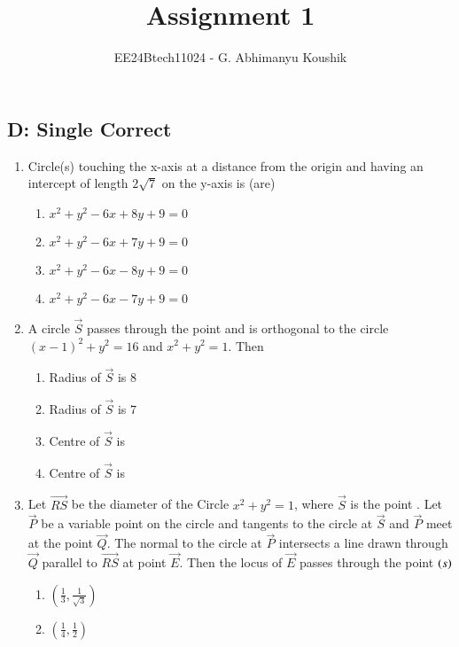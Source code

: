 \documentclass[journal,12pt,twocolumn]{IEEEtran}
\theoremstyle{remark}
\begin{document}
\title{Assignment 1}
\author{EE24Btech11024 - G. Abhimanyu Koushik}
\maketitle
\newpage
\bigskip
\renewcommand{\thefigure}{\theenumi}
\renewcommand{\thetable}{\theenumi}
\subsection*{D: Single Correct}
\begin{enumerate}
\item Circle(s) touching the x-axis at a distance  from the origin and having an intercept of length $2\sqrt{7}$ on the y-axis is (are)
\hfill {}
\begin{enumerate}[label=(\alph*)]
\item $x^2 + y^2 - 6x + 8y + 9 = 0$
\item $x^2 + y^2 - 6x + 7y + 9 = 0$
\item $x^2 + y^2 - 6x - 8y + 9 = 0$
\item $x^2 + y^2 - 6x - 7y + 9 = 0$
\end{enumerate}
\item A circle $\vec{S}$ passes through the point  and is orthogonal to the circle $(x-1)^2+y^2=16$ and $x^2+y^2=1$. Then
\hfill{}
\begin{enumerate}[label=(\alph*)]
\item Radius of $\vec{S}$ is $8$
\item Radius of $\vec{S}$ is $7$
\item Centre of $\vec{S}$ is 
\item Centre of $\vec{S}$ is 
\end{enumerate}
\item Let $\vec{RS}$ be the diameter of the Circle $x^{2} + y^{2} = 1$, where $\vec{S}$ is the point . Let $\vec{P}$ be a variable point  on the circle and tangents to the circle at $\vec{S}$ and $\vec{P}$ meet at the point $\vec{Q}$. The normal to the circle at $\vec{P}$ intersects a line drawn through $\vec{Q}$ parallel to $\vec{RS}$ at point $\vec{E}$. Then the locus of $\vec{E}$ passes through the point $\left(s\right)$
\hfill{}
\begin{enumerate}[label=(\alph*)]
\item $\left(\frac{1}{3}, \frac{1}{\sqrt{3}}\right)$
\item $\left(\frac{1}{4}, \frac{1}{2} \right)$

\end{enumerate}
\end{enumerate}
\end{document}
